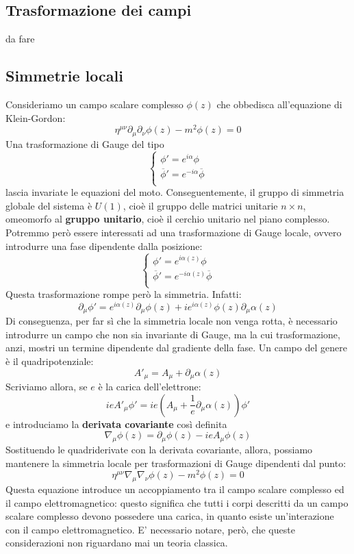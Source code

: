 \documentclass[a4paper,11pt]{book}
\theoremstyle{plain}
\theoremstyle{definition}
\begin{document}
\subsection{Trasformazione dei campi}
da fare

\subsection{Simmetrie locali}
Consideriamo un campo scalare complesso $\phi(z)$ che obbedisca all'equazione di Klein-Gordon:
\[
\eta^{\mu\nu}\partial_{\mu}\partial_{\nu}\phi(z)-m^2\phi(z)=0
\]
Una trasformazione di Gauge del tipo
\[
\begin{cases}
\phi' = e^{i\alpha}\phi \\
\overline{\phi}'=e^{-i\alpha}\overline{\phi}\\
\end{cases}
\]
lascia invariate le equazioni del moto. Conseguentemente, il gruppo di simmetria globale del sistema è $U(1)$, cioè il gruppo delle matrici unitarie $n\times n$, omeomorfo al \textbf{gruppo unitario}, cioè il cerchio unitario nel piano complesso. \\
Potremmo però essere interessati ad una trasformazione di Gauge locale, ovvero introdurre una fase dipendente dalla posizione:
\[
\begin{cases}
\phi' = e^{i\alpha(z)}\phi \\
\overline{\phi}'=e^{-i\alpha(z)}\overline{\phi}\\
\end{cases}
\]
Questa trasformazione rompe però la simmetria. Infatti:
\[
\partial _{\mu}\phi' = e^{i\alpha(z)}\partial_{\mu}\phi(z)+ie^{i\alpha(z)}\phi(z)\partial_{\mu}\alpha(z)
\]
Di conseguenza, per far sì che la simmetria locale non venga rotta, è necessario introdurre un campo che non sia invariante di Gauge, ma la cui trasformazione, anzi, mostri un termine dipendente dal gradiente della fase. Un campo del genere è il quadripotenziale:
\[
A'_{\mu}=A_{\mu}+\partial_{\mu}\alpha(z)
\]
Scriviamo allora, se $e$ è la carica dell'elettrone:
\[
ieA'_{\mu}\phi'=ie\left( A_{\mu}+\frac{1}{e}\partial_{\mu}\alpha(z) \right)\phi'
\]
e introduciamo la \textbf{derivata covariante} così definita
\[
\nabla_{\mu} \phi(z) = \partial_{\mu}\phi(z) - ieA_{\mu}\phi(z)
\]
Sostituendo le quadriderivate con la derivata covariante, allora, possiamo mantenere la simmetria locale per trasformazioni di Gauge dipendenti dal punto:
\[
\eta^{\mu\nu}\nabla_{\mu}\nabla_{\nu}\phi(z)-m^2\phi(z)=0
\]
Questa equazione introduce un accoppiamento tra il campo scalare complesso ed il campo elettromagnetico: questo significa che tutti i corpi descritti da un campo scalare complesso devono possedere una carica, in quanto esiste un'interazione con il campo elettromagnetico. E' necessario notare, però, che queste considerazioni non riguardano mai un teoria classica.
\end{document}
